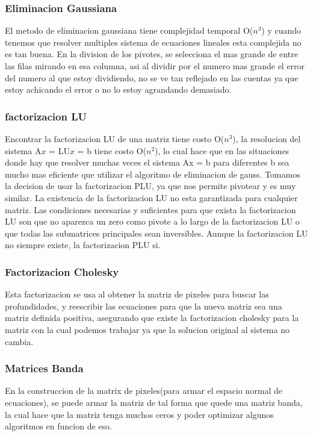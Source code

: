 \subsubsection{Eliminacion Gaussiana}
El metodo de eliminacion gaussiana tiene complejidad temporal O($n^{3}$) y cuando tenemos que resolver multiples sistema de ecuaciones lineales esta complejida no es tan buena.
En la division de los pivotes, se selecciona el mas grande de entre las filas mirando en esa columna, asi al dividir por el numero mas grande el error del numero al que estoy dividiendo, no se ve tan reflejado en las cuentas ya que estoy achicando el error o no lo estoy agrandando demasiado.


\subsubsection{factorizacion LU}
Encontrar la factorizacion LU de una matriz tiene costo O($n^{3}$), la resolucion del sistema A$x$ = LU$x$ = b tiene costo O($n^{2}$), lo cual hace que en las situaciones donde hay que resolver muchas veces el sistema Ax = b para diferentes b sea mucho mas eficiente que utilizar el algoritmo de eliminacion de gauss. 
Tomamos la decision de usar la factorizacion PLU, ya que nos permite pivotear y es muy similar. 
La existencia de la factorizacion LU no esta garantizada para cualquier matriz. Las condiciones necesarias y suficientes para que exista la factorizacion LU son que no aparezca un zero como pivote a lo largo de la factorizacion LU o que todas las submatrices principales sean inversibles. Aunque la factorizacion LU no siempre existe, la factorizacion PLU si.

\subsubsection{Factorizacion Cholesky}
Esta factorizacion se usa al obtener la matriz de pixeles para buscar las profundidades, y reescribir las ecuaciones para que la nueva matriz sea una matriz definida positiva, asegurando que existe la factorizacion cholesky para la matriz con la cual podemos trabajar ya que la solucion original al sistema no cambia.

\subsubsection{Matrices Banda}
En la construccion de la matrix de pixeles(para armar el espacio normal de ecuaciones), se puede armar la matriz de tal forma que quede una matriz banda, la cual hace que la matriz tenga muchos ceros y poder optimizar algunos algoritmos en funcion de eso.


